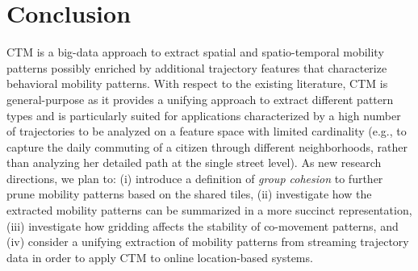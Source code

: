 \documentclass[
]{ceurart}
\newtheorem{proof}{Proof}
\begin{document}
\section{Conclusion}\label{sec:conclusion}
CTM is a big-data approach to extract spatial and spatio-temporal mobility patterns possibly enriched by additional trajectory features that characterize behavioral mobility patterns.
With respect to the existing literature, CTM is general-purpose as it provides a unifying approach to extract different pattern types and is particularly suited for applications characterized by a high number of trajectories to be analyzed on a feature space with limited cardinality (e.g., to capture 
the daily commuting of a citizen through different neighborhoods, rather than analyzing her detailed path at the single street level).
As new research directions, we plan to: (i) introduce a definition of \textit{group cohesion} to further prune mobility patterns based on the shared tiles, (ii) investigate how the extracted mobility patterns can be summarized in a more succinct representation, (iii) investigate how gridding affects the stability of co-movement patterns, and (iv) consider a unifying extraction of mobility patterns from streaming trajectory data in order to apply CTM to online location-based systems.



\end{document}
